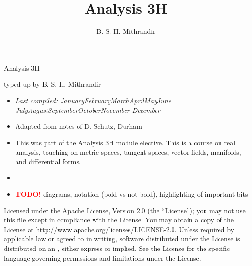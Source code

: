 \documentclass[letter-paper]{tufte-book}
\title{Analysis 3H}
\author[]{B. S. H. Mithrandir}
\newcommand{\monthyear}{%
  \ifcase\month\or January\or February\or March\or April\or May\or June\or
  July\or August\or September\or October\or November\or
  December\fi\space\number\year
}
\newcommand{\TODO}{\textcolor{red}{\bf TODO!}\xspace}
\begin{document}



\chapter*{}

\begin{fullwidth}

\par \begin{center}{\Huge Analysis 3H}\end{center}

\vspace*{5mm}

\par \begin{center}{\Large typed up by B. S. H. Mithrandir}\end{center}

\vspace*{5mm}

\begin{itemize}
  \item \textit{Last compiled: \monthyear}
  \item Adapted from notes of D. Sch\"utz, Durham
  \item This was part of the Analysis 3H module elective. This is a course on
  real analysis, touching on metric spaces, tangent spaces, vector fields,
  manifolds, and differential forms.
  \item[]
  \item \TODO diagrams, notation (bold vs not bold), highlighting of important bits
\end{itemize}

\par

\par Licensed under the Apache License, Version 2.0 (the ``License''); you may not
use this file except in compliance with the License. You may obtain a copy
of the License at \url{http://www.apache.org/licenses/LICENSE-2.0}. Unless
required by applicable law or agreed to in writing, software distributed
under the License is distributed on an , either express or implied. See the
License for the specific language governing permissions and limitations
under the License.
\end{fullwidth}
\end{document}
